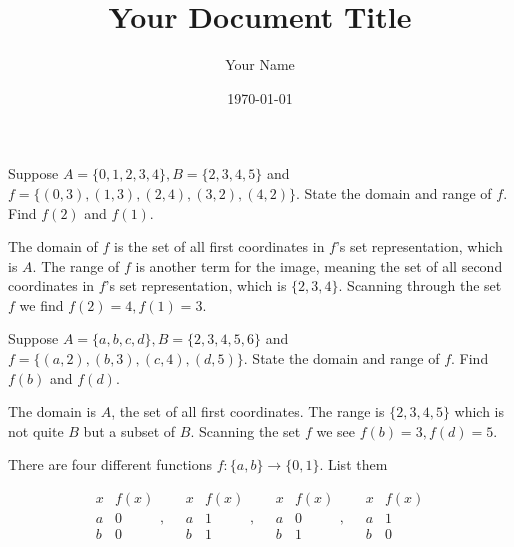 \documentclass{article}
\title{Your Document Title}
\author{Your Name}
\date{\today} %
\begin{document}
\maketitle

\begin{problem}
Suppose $A = \{0, 1, 2, 3, 4\}, B = \{2, 3, 4, 5\}$ and $f = \{(0, 3), (1, 3), (2, 4), (3, 2), (4, 2)\}$. State the domain and range of $f$. Find $f(2)$ and $f(1)$.
\end{problem}

The domain of $f$ is the set of all first coordinates in $f$'s set representation, which is $A$. The range of $f$ is another term for the image, meaning the set of all second coordinates in $f$'s set representation, which is $\{2, 3, 4\}$. Scanning through the set $f$ we find $f(2) = 4, f(1) = 3$.

\begin{problem}
Suppose $A = \{a, b, c, d\}, B = \{2, 3, 4, 5, 6\}$ and $f = \{(a, 2), (b, 3), (c, 4), (d, 5)\}$. State the domain and range of $f$. Find $f(b)$ and $f(d)$.
\end{problem}

The domain is $A$, the set of all first coordinates. The range is $\{2, 3, 4, 5\}$ which is not quite $B$ but a subset of $B$. Scanning the set $f$ we see $f(b) = 3, f(d) = 5$.

\begin{problem}
There are four different functions $f: \{a, b\} \to \{0, 1\}$. List them
\end{problem}
$$\begin{array}{c|c}
    x & f(x) \\
    \hline
    a & 0    \\
    b & 0    \\
  \end{array}, \quad
  \begin{array}{c|c}
    x & f(x) \\
    \hline
    a & 1    \\
    b & 1    \\
  \end{array}, \quad
  \begin{array}{c|c}
    x & f(x) \\
    \hline
    a & 0    \\
    b & 1    \\
  \end{array}, \quad
  \begin{array}{c|c}
    x & f(x) \\
    \hline
    a & 1    \\
    b & 0    \\
  \end{array}
$$
\end{document}
